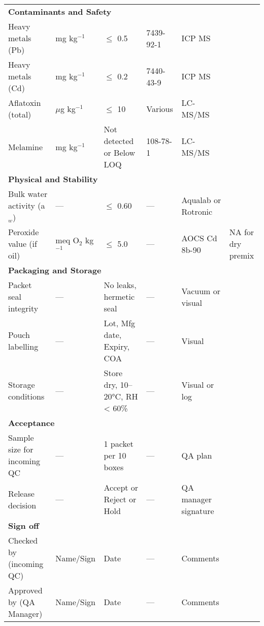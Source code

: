 \begin{longtable}{@{}p{6.0cm}p{1.5cm}p{1.8cm}p{2.0cm}p{3.0cm}p{3.0cm}@{}}
\multicolumn{6}{l}{\textbf{Contaminants and Safety}} \\[3pt]
Heavy metals (Pb) & mg kg$^{-1}$ & $\le$ 0.5 & 7439-92-1 & ICP MS & \\[3pt]
Heavy metals (Cd) & mg kg$^{-1}$ & $\le$ 0.2 & 7440-43-9 & ICP MS & \\[3pt]
Aflatoxin (total) & $\mu$g kg$^{-1}$ & $\le$ 10 & Various & LC-MS/MS & \\[3pt]
Melamine & mg kg$^{-1}$ & Not detected or Below LOQ & 108-78-1 & LC-MS/MS & \\[6pt]

\multicolumn{6}{l}{\textbf{Physical and Stability}} \\[3pt]
Bulk water activity (a$_w$) & --- & $\le$ 0.60 & --- & Aqualab or Rotronic & \\[3pt]
Peroxide value (if oil) & meq O$_2$ kg$^{-1}$ & $\le$ 5.0 & --- & AOCS Cd 8b-90 & NA for dry premix \\[6pt]

\multicolumn{6}{l}{\textbf{Packaging and Storage}} \\[3pt]
Packet seal integrity & --- & No leaks, hermetic seal & --- & Vacuum or visual & \\[3pt]
Pouch labelling & --- & Lot, Mfg date, Expiry, COA & --- & Visual & \\[3pt]
Storage conditions & --- & Store dry, 10--20°C, RH < 60\% & --- & Visual or log & \\[6pt]

\multicolumn{6}{l}{\textbf{Acceptance}} \\[3pt]
Sample size for incoming QC & --- & 1 packet per 10 boxes & --- & QA plan & \\[3pt]
Release decision & --- & Accept or Reject or Hold & --- & QA manager signature & \\[6pt]

\multicolumn{6}{l}{\textbf{Sign off}} \\[3pt]
Checked by (incoming QC) & Name/Sign & Date & --- & Comments & \\[12pt]
Approved by (QA Manager) & Name/Sign & Date & --- & Comments & \\
\bottomrule
\end{longtable}
\vspace{0.5em}

